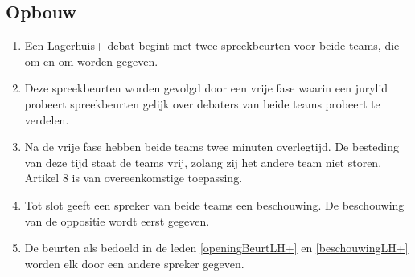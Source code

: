 \subsection{Opbouw}

\begin{enumerate}
\item \label{openingBeurtLH+} Een Lagerhuis+ debat begint met twee spreekbeurten voor beide teams, die om en om worden gegeven.
\item \label{vrijeFaseLH+} Deze spreekbeurten worden gevolgd door een vrije fase waarin een jurylid probeert spreekbeurten gelijk over debaters van beide teams probeert te verdelen.
\item \label{overlegTijdLH+} Na de vrije fase hebben beide teams twee minuten overlegtijd. De besteding van deze tijd staat de teams vrij, zolang zij het andere team niet storen. Artikel 8 is van overeenkomstige toepassing.
\item \label{beschouwingLH+} Tot slot geeft een spreker van beide teams een beschouwing. De beschouwing van de oppositie wordt eerst gegeven.
\item De beurten als bedoeld in de leden \ref{openingBeurtLH+} en \ref{beschouwingLH+} worden elk door een andere spreker gegeven.
\end{enumerate}
